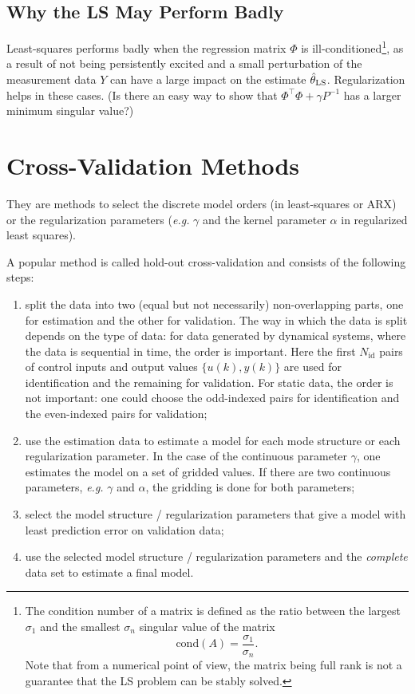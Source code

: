 \subsection{Why the LS May Perform Badly}
\label{sec:LS-illconditioned}

Least-squares performs badly when the regression matrix $\Phi$ is ill-conditioned\footnote{The condition number of a matrix is defined as the ratio between the largest $\sigma_1$ and the smallest $\sigma_n$ singular value of the matrix
  \begin{equation*}
    \textrm{cond}(A) = \frac{\sigma_1}{\sigma_n}.
  \end{equation*}
  Note that from a numerical point of view, the matrix being full rank is not a guarantee that the LS problem can be stably solved.}, as a result of not being persistently excited and a small perturbation of the measurement data $Y$ can have a large impact on the estimate $\hat{\theta}_\textrm{LS}$. Regularization helps in these cases. (Is there an easy way to show that $\Phi^\top\Phi + \gamma P^{-1}$ has a larger minimum singular value?)

\section{Cross-Validation Methods}
\label{sec:cross-validation}

They are methods to select the discrete model orders (in least-squares or ARX) or the regularization parameters (\textit{e.g.} $\gamma$ and the kernel parameter $\alpha$ in regularized least squares).

A popular method is called hold-out cross-validation and consists of the following steps:
\begin{enumerate}
\item split the data into two (equal but not necessarily) non-overlapping parts, one for estimation and the other for validation. The way in which the data is split depends on the type of data: for data generated by dynamical systems, where the data is sequential in time, the order is important. Here the first $N_\textrm{id}$ pairs of control inputs and output values $\{u(k),y(k)\}$ are used for identification and the remaining for validation. For static data, the order is not important: one could choose the odd-indexed pairs for identification and the even-indexed pairs for validation;
\item use the estimation data to estimate a model for each mode structure or each regularization parameter. In the case of the continuous parameter $\gamma$, one estimates the model on a set of gridded values. If there are two continuous parameters, \textit{e.g.} $\gamma$ and $\alpha$, the gridding is done for both parameters;
\item select the model structure / regularization parameters that give a model with least prediction error on validation data;
\item use the selected model structure / regularization parameters and the \emph{complete} data set to estimate a final model.
\end{enumerate}

